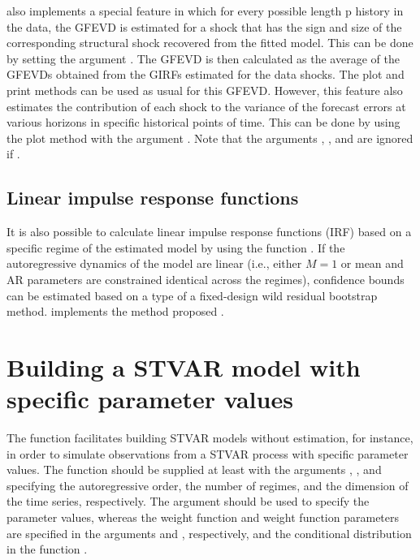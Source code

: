 \documentclass[nojss]{jss}
\begin{document}
 also implements a special feature in which for every possible length p history in the data, the GFEVD is estimated for a shock that has the sign and size of the corresponding structural shock recovered from the fitted model. This can be done by setting the argument . The GFEVD is then calculated as the average of the GFEVDs obtained from the GIRFs estimated for the data shocks. The plot and print methods can be used as usual for this GFEVD. However, this feature also estimates the contribution of each shock to the variance of the forecast errors at various horizons in specific historical points of time. This can be done by using the plot method with the argument . Note that the arguments , , and  are ignored if .

\subsection{Linear impulse response functions}
It is also possible to calculate linear impulse response functions (IRF) based on a specific regime of the estimated model by using the function . If the autoregressive dynamics of the model are linear (i.e., either $M=1$ or mean and AR parameters are constrained identical across the regimes), confidence bounds can be estimated based on a type of a fixed-design wild residual bootstrap method.  implements the method proposed \cite{Herwartz+Lutkepohl:2014}.

\section{Building a STVAR model with specific parameter values}\label{sec:STVAR}
The function  facilitates building STVAR models without estimation, for instance, in order to simulate observations from a STVAR process with specific parameter values. The function should be supplied at least with the arguments , , and  specifying the autoregressive order, the number of regimes, and the dimension of the time series, respectively. The argument  should be used to specify the parameter values, whereas the weight function and weight function parameters are specified in the arguments  and , respectively, and the conditional distribution in the function .
\end{document}
